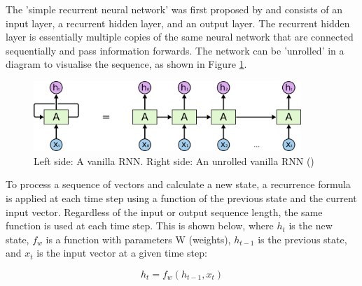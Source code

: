 




The 'simple recurrent neural network' was first proposed by \cite{elman_original_rnn_1990} and consists of an input layer, a recurrent hidden layer, and an output layer. The recurrent hidden layer is essentially multiple copies of the same neural network that are connected sequentially and pass information forwards. The network can be 'unrolled' in a diagram to visualise the sequence, as shown in Figure \ref{fig:rnn_unrolled}.

\begin{figure}[ht!]
\centering
\includegraphics[width=0.9\textwidth]{media/literature/machine_learning/ml_rnn_unrolled.png}
\caption[Diagram of an unrolled Recurrent Neural Network]{Left side: A vanilla \acrlong{RNN}. Right side: An unrolled vanilla \acrlong{RNN} (\cite{colah_lstm_2019})}
\label{fig:rnn_unrolled}
\end{figure}

To process a sequence of vectors and calculate a new state, a recurrence formula is applied at each time step using a function of the previous state and the current input vector. Regardless of the input or output sequence length, the same function is used at each time step. This is shown below, where $h_t$ is the new state, $f_w$ is a function with parameters W (weights), $h_{t-1}$ is the previous state, and $x_t$ is the input vector at a given time step: 

\begin{equation}
    h_{t} = f_{w} \left ( h_{t-1},x_{t} \right )
\end{equation}

